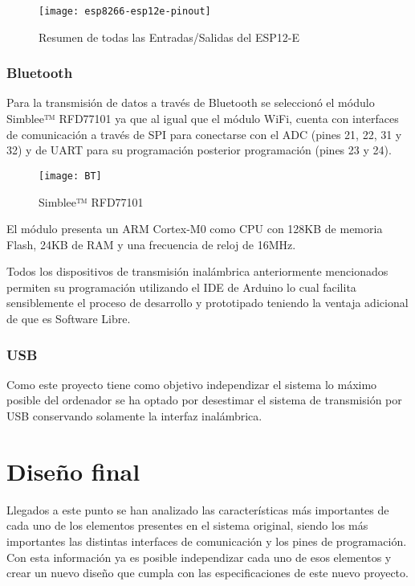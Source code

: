 \clearpage

\begin{figure} [h]
    \centering
    \texttt{[image: esp8266-esp12e-pinout]}
    \caption{Resumen de todas las Entradas/Salidas del ESP12-E \cite{ESP_Pinout}}
    \label{fig:ESP8266_pinout}
\end{figure}

\subsubsection{Bluetooth\label{sec:Bluetooth_N}}

Para la transmisión de datos a través de Bluetooth se seleccionó el módulo Simblee™ RFD77101 ya que al igual que el módulo WiFi, cuenta con interfaces de comunicación a través de \acrshort{SPI} para conectarse con el \acrshort{ADC} (pines 21, 22, 31 y 32) y de \acrshort{UART} para su programación posterior programación (pines 23 y 24).

\begin{figure} [H]
    \centering
    \texttt{[image: BT]}
    \caption{Simblee™ RFD77101 \cite{Datasheet_BT}}
    \label{fig:BT}
\end{figure}

El módulo presenta un ARM Cortex-M0 como \acrshort{CPU} con 128KB de memoria Flash, 24KB de \acrshort{RAM} y una frecuencia de reloj de 16MHz. 

Todos los dispositivos de transmisión inalámbrica anteriormente mencionados permiten su programación utilizando el \acrshort{IDE} de Arduino lo cual facilita sensiblemente el proceso de desarrollo y prototipado teniendo la ventaja adicional de que es Software Libre.


\subsubsection{USB\label{sec:USB_N}}


Como este proyecto tiene como objetivo independizar el sistema lo máximo posible del ordenador se ha optado por desestimar el sistema de transmisión por \acrshort{USB} conservando solamente la interfaz inalámbrica. 

\section{Diseño final\label{sec:Diseño_final}}
          
Llegados a este punto se han analizado las características más importantes de cada uno de los elementos presentes en el sistema original, siendo los más importantes las distintas interfaces de comunicación y los pines de programación.
\\Con esta información ya es posible independizar cada uno de esos elementos y crear un nuevo diseño que cumpla con las especificaciones de este nuevo proyecto.

